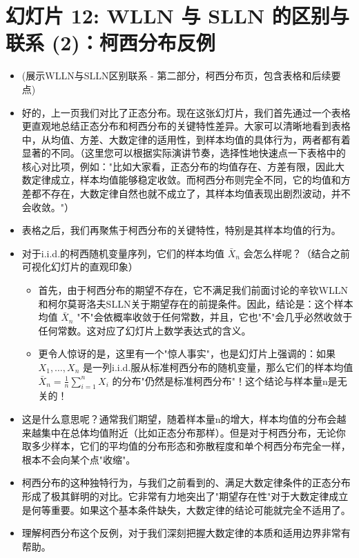 \documentclass[UTF8]{article} %
\begin{document}
\section*{幻灯片 12: WLLN 与 SLLN 的区别与联系 (2)：柯西分布反例}
\begin{itemize}
    \itemsep1em
    \item (展示WLLN与SLLN区别联系 - 第二部分，柯西分布页，包含表格和后续要点)
    \item 好的，上一页我们对比了正态分布。现在这张幻灯片，我们首先通过一个表格更直观地总结正态分布和柯西分布的关键特性差异。大家可以清晰地看到表格中，从均值、方差、大数定律的适用性，到样本均值的具体行为，两者都有着显著的不同。（这里您可以根据实际演讲节奏，选择性地快速点一下表格中的核心对比项，例如："比如大家看，正态分布的均值存在、方差有限，因此大数定律成立，样本均值能够稳定收敛。而柯西分布则完全不同，它的均值和方差都不存在，大数定律自然也就不成立了，其样本均值表现出剧烈波动，并不会收敛。"）
    \item 表格之后，我们再聚焦于柯西分布的关键特性，特别是其样本均值的行为。
    \item 对于i.i.d.的柯西随机变量序列，它们的样本均值 $\bar{X}_n$ 会怎么样呢？（结合之前可视化幻灯片的直观印象）
    \begin{itemize}[label=\textbullet, itemsep=0.3em]
        \item 首先，由于柯西分布的期望不存在，它不满足我们前面讨论的辛钦WLLN和柯尔莫哥洛夫SLLN关于期望存在的前提条件。因此，结论是：这个样本均值 $\bar{X}_n$ "不"会依概率收敛于任何常数，并且，它也"不"会几乎必然收敛于任何常数。这对应了幻灯片上数学表达式的含义。
        \item 更令人惊讶的是，这里有一个"惊人事实"，也是幻灯片上强调的：如果 $X_1, \dots, X_n$ 是一列i.i.d.服从标准柯西分布的随机变量，那么它们的样本均值 $\bar{X}_n = \frac{1}{n} \sum_{i=1}^n X_i$ 的分布"仍然是标准柯西分布"！这个结论与样本量n是无关的！
    \end{itemize}
    \item 这是什么意思呢？通常我们期望，随着样本量n的增大，样本均值的分布会越来越集中在总体均值附近（比如正态分布那样）。但是对于柯西分布，无论你取多少样本，它们的平均值的分布形态和弥散程度和单个柯西分布完全一样，根本不会向某个点"收缩"。
    \item 柯西分布的这种独特行为，与我们之前看到的、满足大数定律条件的正态分布形成了极其鲜明的对比。它非常有力地突出了"期望存在性"对于大数定律成立是何等重要。如果这个基本条件缺失，大数定律的结论可能就完全不适用了。
    \item 理解柯西分布这个反例，对于我们深刻把握大数定律的本质和适用边界非常有帮助。
\end{itemize}
\end{document}
